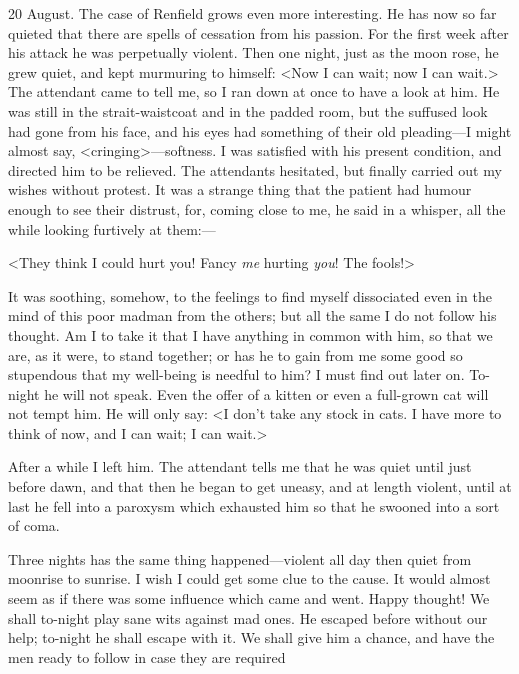 \begin{diary}{20 August.}
The case of Renfield grows even more interesting. He has now so far quieted that there are spells of cessation from his passion. For the first week after his attack he was perpetually violent. Then one night, just as the moon rose, he grew quiet, and kept murmuring to himself: <Now I can wait; now I can wait.> The attendant came to tell me, so I ran down at once to have a look at him. He was still in the strait-waistcoat and in the padded room, but the suffused look had gone from his face, and his eyes had something of their old pleading—I might almost say, <cringing>—softness. I was satisfied with his present condition, and directed him to be relieved. The attendants hesitated, but finally carried out my wishes without protest. It was a strange thing that the patient had humour enough to see their distrust, for, coming close to me, he said in a whisper, all the while looking furtively at them:—

<They think I could hurt you! Fancy \textit{me} hurting \textit{you}! The fools!>

It was soothing, somehow, to the feelings to find myself dissociated even in the mind of this poor madman from the others; but all the same I do not follow his thought. Am I to take it that I have anything in common with him, so that we are, as it were, to stand together; or has he to gain from me some good so stupendous that my well-being is needful to him? I must find out later on. To-night he will not speak. Even the offer of a kitten or even a full-grown cat will not tempt him. He will only say: <I don't take any stock in cats. I have more to think of now, and I can wait; I can wait.>

After a while I left him. The attendant tells me that he was quiet until just before dawn, and that then he began to get uneasy, and at length violent, until at last he fell into a paroxysm which exhausted him so that he swooned into a sort of coma.

 

\textellipsis Three nights has the same thing happened—violent all day then quiet from moonrise to sunrise. I wish I could get some clue to the cause. It would almost seem as if there was some influence which came and went. Happy thought! We shall to-night play sane wits against mad ones. He escaped before without our help; to-night he shall escape with it. We shall give him a chance, and have the men ready to follow in case they are required
\end{diary}

